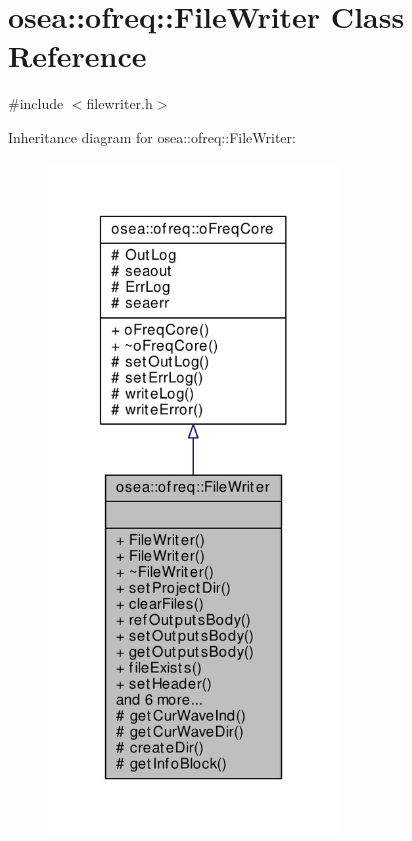 \hypertarget{classosea_1_1ofreq_1_1_file_writer}{\section{osea\-:\-:ofreq\-:\-:File\-Writer Class Reference}
\label{classosea_1_1ofreq_1_1_file_writer}
}


{\ttfamily \#include $<$filewriter.\-h$>$}



Inheritance diagram for osea\-:\-:ofreq\-:\-:File\-Writer\-:
\nopagebreak
\begin{figure}[H]
\begin{center}
\leavevmode
\includegraphics[width=218pt]{classosea_1_1ofreq_1_1_file_writer__inherit__graph}
\end{center}
\end{figure}
